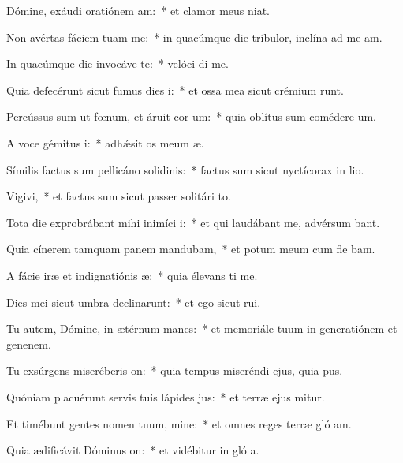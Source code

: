 \item Dómine, exáudi oratiónem am:~* et clamor meus   niat.
\item Non avértas fáciem tuam  me:~* in quacúmque die tríbulor, inclína ad me  am.
\item In quacúmque die invocáve te:~* velóci di me.
\item Quia defecérunt sicut fumus dies i:~* et ossa mea sicut crémium runt.
\item Percússus sum ut fœnum, et áruit cor um:~* quia oblítus sum comédere  um.
\item A voce gémitus i:~* adhǽsit os meum  æ.
\item Símilis factus sum pellicáno solidinis:~* factus sum sicut nyctícorax in lio.
\item Vigivi,~* et factus sum sicut passer solitári  to.
\item Tota die exprobrábant mihi inimíci i:~* et qui laudábant me, advérsum  bant.
\item Quia cínerem tamquam panem mandubam,~* et potum meum cum fle bam.
\item A fácie iræ et indignatiónis æ:~* quia élevans ti me.
\item Dies mei sicut umbra declinarunt:~* et ego sicut  rui.
\item Tu autem, Dómine, in ætérnum manes:~* et memoriále tuum in generatiónem et genenem.
\item Tu exsúrgens miseréberis on:~* quia tempus miseréndi ejus, quia  pus.
\item Quóniam placuérunt servis tuis lápides jus:~* et terræ ejus mitur.
\item Et timébunt gentes nomen tuum, mine:~* et omnes reges terræ gló am.
\item Quia ædificávit Dóminus on:~* et vidébitur in gló a.
